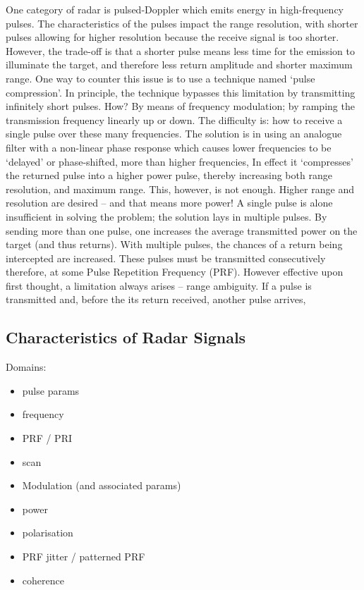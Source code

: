 One category of radar is pulsed-Doppler which emits energy in high-frequency pulses. The characteristics of the pulses impact the range resolution, with shorter pulses allowing for higher resolution because the receive signal is too shorter. However, the trade-off is that a shorter pulse means less time for the emission to illuminate the target, and therefore less return amplitude and shorter maximum range. One way to counter this issue is to use a technique named ‘pulse compression’. In principle, the technique bypasses this limitation by transmitting infinitely short pulses. How? By means of frequency modulation; by ramping the transmission frequency linearly up or down. The difficulty is: how to receive a single pulse over these many frequencies. The solution is in using an analogue filter with a non-linear phase response which causes lower frequencies to be ‘delayed’ or phase-shifted, more than higher frequencies, In effect it ‘compresses’ the returned pulse into a higher power pulse, thereby increasing both range resolution, and maximum range. This, however, is not enough. Higher range and resolution are desired – and that means more power! A single pulse is alone insufficient in solving the problem; the solution lays in multiple pulses. By sending more than one pulse, one increases the average transmitted power on the target (and thus returns). With multiple pulses, the chances of a return being intercepted are increased. These pulses must be transmitted consecutively therefore, at some Pulse Repetition Frequency (PRF). However effective upon first thought, a limitation always arises – range ambiguity. If a pulse is transmitted and, before the its return received, another pulse arrives,  \cite{parker_chapter_2010}


\subsection{Characteristics of Radar Signals}

Domains: 
\begin{itemize}
    \item pulse params
    \item frequency
    \item PRF / PRI
    \item scan
    \item Modulation (and associated params)
    \item power
    \item polarisation
    \item PRF jitter / patterned PRF
    \item coherence
\end{itemize}

